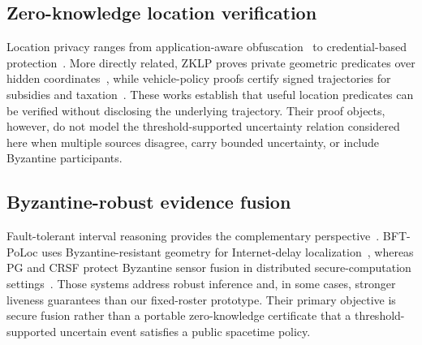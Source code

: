 \documentclass[preprint,review,12pt]{elsarticle}
\begin{document}
\subsection{Zero-knowledge location verification}
Location privacy ranges from application-aware obfuscation~\cite{Mdee2022,Atmaca2024} to credential-based protection~\cite{Ghani2025,Zhang2025Sybil,Wang2025ZKAuth}. More directly related, ZKLP proves private geometric predicates over hidden coordinates~\cite{ZKLP}, while vehicle-policy proofs certify signed trajectories for subsidies and taxation~\cite{VehiclePolicy}. These works establish that useful location predicates can be verified without disclosing the underlying trajectory. Their proof objects, however, do not model the threshold-supported uncertainty relation considered here when multiple sources disagree, carry bounded uncertainty, or include Byzantine participants.

\subsection{Byzantine-robust evidence fusion}
Fault-tolerant interval reasoning provides the complementary perspective~\cite{Marzullo1990}. BFT-PoLoc uses Byzantine-resistant geometry for Internet-delay localization~\cite{BFTPoLoc}, whereas PG and CRSF protect Byzantine sensor fusion in distributed secure-computation settings~\cite{PG,CRSF}. Those systems address robust inference and, in some cases, stronger liveness guarantees than our fixed-roster prototype. Their primary objective is secure fusion rather than a portable zero-knowledge certificate that a threshold-supported uncertain event satisfies a public spacetime policy.
\end{document}
